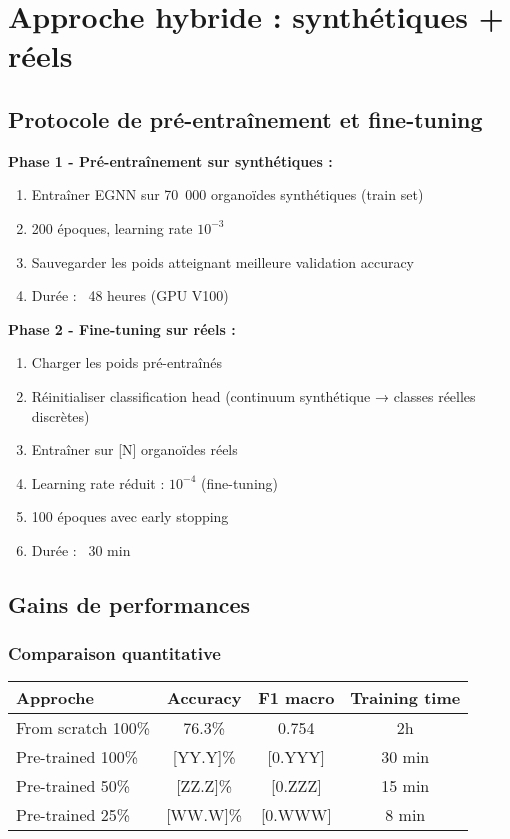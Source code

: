 \section{Approche hybride : synthétiques + réels}

\subsection{Protocole de pré-entraînement et fine-tuning}

\textbf{Phase 1 - Pré-entraînement sur synthétiques :}
\begin{enumerate}
    \item Entraîner EGNN sur 70~000 organoïdes synthétiques (train set)
    \item 200 époques, learning rate $10^{-3}$
    \item Sauvegarder les poids atteignant meilleure validation accuracy
    \item Durée : ~48 heures (GPU V100)
\end{enumerate}

\textbf{Phase 2 - Fine-tuning sur réels :}
\begin{enumerate}
    \item Charger les poids pré-entraînés
    \item Réinitialiser classification head (continuum synthétique → classes réelles discrètes)
    \item Entraîner sur [N] organoïdes réels
    \item Learning rate réduit : $10^{-4}$ (fine-tuning)
    \item 100 époques avec early stopping
    \item Durée : ~30 min
\end{enumerate}

\subsection{Gains de performances}

\subsubsection{Comparaison quantitative}

\begin{center}
\begin{tabular}{|l|c|c|c|}
\hline
\textbf{Approche} & \textbf{Accuracy} & \textbf{F1 macro} & \textbf{Training time} \\
\hline
From scratch 100\% & 76.3\% & 0.754 & 2h \\
Pre-trained 100\% & [YY.Y]\% & [0.YYY] & 30 min \\
Pre-trained 50\% & [ZZ.Z]\% & [0.ZZZ] & 15 min \\
Pre-trained 25\% & [WW.W]\% & [0.WWW] & 8 min \\
\hline
\end{tabular}
\end{center}

